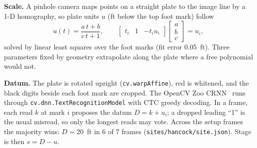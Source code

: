 \documentclass[conference,10pt,letterpaper]{IEEEtran}
\newcommand{\cv}[1]{\texttt{\small cv.#1}}
\begin{document}
\textbf{Scale.} A pinhole camera maps points on a straight plate to the image line by a 1-D
homography, so plate units $u$ (ft below the top foot mark) follow
\begin{equation}
u(t)=\frac{a\,t+b}{c\,t+1},\qquad
\begin{bmatrix} t_i & 1 & -t_i u_i\end{bmatrix}
\begin{bmatrix} a\\ b\\ c\end{bmatrix}=u_i ,
\label{eq:homography}
\end{equation}
solved by linear least squares over the foot marks (fit error 0.05~ft). Three parameters fixed
by geometry extrapolate along the plate where a free polynomial would not.

\textbf{Datum.} The plate is rotated upright (\cv{warpAffine}), red is whitened, and the black
digits beside each foot mark are cropped. The OpenCV Zoo CRNN~\cite{shi2015crnn,zoo} runs through
\cv{dnn.TextRecognitionModel} with CTC greedy decoding. In a frame, each read $k$ at mark $i$
proposes the datum $D=k+u_i$; a dropped leading ``1'' is the usual misread, so only the longest
reads may vote. Across the setup frames the majority wins: $D=20$~ft in 6 of 7 frames (\texttt{sites/hancock/site.json}). Stage is
then $s=D-u$.
\end{document}
